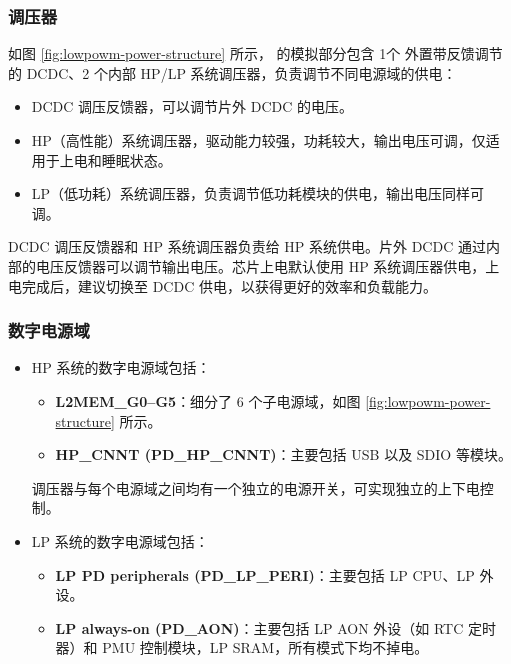 \documentclass[main\_\_CN.tex]{subfiles}
\begin{document}
\subsubsection{调压器}\label{sec:lowpowm-regulators}

如图 \ref{fig:lowpowm-power-structure} 所示，\chipname{} 的模拟部分包含 1个 外置带反馈调节的 DCDC、2 个内部 HP/LP 系统调压器，负责调节不同电源域的供电：

\begin{itemize}
\item DCDC 调压反馈器，可以调节片外 DCDC 的电压。
\item HP（高性能）系统调压器，驱动能力较强，功耗较大，输出电压可调，仅适用于上电和睡眠状态。
\item LP（低功耗）系统调压器，负责调节低功耗模块的供电，输出电压同样可调。
\end{itemize}

DCDC 调压反馈器和 HP 系统调压器负责给 HP 系统供电。片外 DCDC 通过内部的电压反馈器可以调节输出电压。芯片上电默认使用 HP 系统调压器供电，上电完成后，建议切换至 DCDC 供电，以获得更好的效率和负载能力。

\subsubsection{数字电源域}\label{sec:lowpowm_digital_domain}

\begin{itemize}
\item HP 系统的数字电源域包括：
    \begin{itemize}
    \item \textbf{L2MEM\_G0–G5}：细分了 6 个子电源域，如图 \ref{fig:lowpowm-power-structure} 所示。
    \item \textbf{HP\_CNNT (PD\_HP\_CNNT)}：主要包括 USB 以及 SDIO 等模块。
    \end{itemize}

调压器与每个电源域之间均有一个独立的电源开关，可实现独立的上下电控制。

\item LP 系统的数字电源域包括：
    \begin{itemize}
    \item \textbf{LP PD peripherals (PD\_LP\_PERI)}：主要包括 LP CPU、LP 外设。
    \item \textbf{LP always-on (PD\_AON)}：主要包括 LP AON 外设（如 RTC 定时器）和 PMU 控制模块，LP SRAM，所有模式下均不掉电。
    \end{itemize}
\end{itemize}
\end{document}
